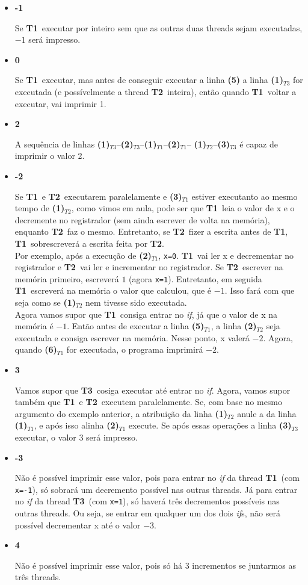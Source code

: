 \documentclass{article}
\newcommand{\Tu}{\textbf{T1}}
\newcommand{\Td}{\textbf{T2}}
\newcommand{\Tt}{\textbf{T3}}
\newcommand{\TL}[2]{\textbf{(#1)}$_{T#2}$}
\begin{document}
\begin{itemize}
	\item \textbf{-1}\par
		Se \Tu\ executar por inteiro sem que as outras duas threads sejam executadas, $-1$ será impresso.
	\item \textbf{0}\par
		Se \Tu\ executar, mas antes de conseguir executar a linha \textbf{(5)} a linha \TL{1}{3}
		for executada (e possívelmente a thread \Td\ inteira), então quando \Tu\ voltar a executar, vai imprimir 1.
	\item \textbf{2}\par
		A sequência de linhas \TL{1}{3}--\TL{2}{3}--\TL{1}{1}--\TL{2}{1}--%
		\TL{1}{2}--\TL{3}{3} é capaz de imprimir o valor 2.
		\pagebreak
	\item \textbf{-2}\par
		Se \Tu\ e \Td\ executarem paralelamente e \TL{3}{1} estiver executanto ao mesmo tempo de \TL{1}{2},
		como vimos em aula, pode ser que \Tu\ leia o valor de x e o decremente no registrador (sem ainda escrever
		de volta na memória), enquanto \Td\ faz o mesmo. Entretanto, se \Td\ fizer a escrita antes de \Tu, \Tu\
		sobrescreverá a escrita feita por \Td.\\
		Por exemplo, após a execução de \TL{2}{1}, \texttt{x=0}. \Tu\ vai ler x e decrementar no registrador e
		\Td\ vai ler e incrementar no registrador. Se \Td\ escrever na memória primeiro, escreverá $1$ (agora \texttt{x=1}).
		Entretanto, em seguida \Tu\ escreverá na memória o valor que calculou, que é $-1$. Isso fará com que seja como se
		\TL{1}{2} nem tivesse sido executada.\\
		Agora vamos supor que \Tu\ consiga entrar no \emph{if}, já que o valor de x na memória é $-1$. Então antes de executar
		a linha \TL{5}{1}, a linha \TL{2}{2} seja executada e consiga escrever na memória. Nesse ponto, x valerá $-2$. Agora,
		quando \TL{6}{1} for executada, o programa imprimirá $-2$.
	\item \textbf{3}\par
		Vamos supor que \Tt\ cosiga executar até entrar no \emph{if}. Agora, vamos supor também que \Tu\ e \Td\ executem
		paralelamente. Se, com base no mesmo argumento do exemplo anterior, a atribuição da linha \TL{1}{2} anule a da linha
		\TL{1}{1}, e após isso alinha \TL{2}{1} execute. Se após essas operações a linha \TL{3}{3} executar, o valor 3 será
		impresso.
	\item \textbf{-3}\par
		Não é possível imprimir esse valor, pois para entrar no \emph{if} da thread \Tu\ (com \texttt{x=-1}), só sobrará um
		decremento possível nas outras threads. Já para entrar no \emph{if} da thread \Tt\ (com \texttt{x=1}), só haverá três
		decrementos possíveis nas outras threads. Ou seja, se entrar em qualquer um dos dois \emph{if}s, não será possível
		decrementar x até o valor $-3$.
	\item \textbf{4}\par
		Não é possível imprimir esse valor, pois só há 3 incrementos se juntarmos as três threads.
\end{itemize}
\end{document}
